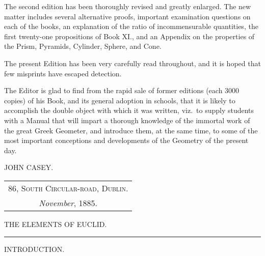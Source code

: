 \documentclass[oneside]{book}
\newcommand{\ibksp}{\hspace{-1.5em}}
\begin{document}
The second edition has been thoroughly revised
and greatly enlarged. The new matter includes
several alternative proofs, important examination
questions on each of the books, an explanation of
the ratio of incommensurable quantities, the first
twenty-one propositions of Book XI\@., and an
Appendix on the properties of the Prism, Pyramids,
Cylinder, Sphere, and Cone.

The present Edition has been very carefully
read throughout, and it is hoped that few misprints
have escaped detection.

The Editor is glad to find from the rapid sale of
former editions (each 3000 copies) of his Book, and
its general adoption in schools, that it is likely to
accomplish the double object with which it was
written, viz.\ to supply students with a Manual
that will impart a thorough knowledge of the
immortal work of the great Greek Geometer, and
introduce them, at the same time, to some of the
most important conceptions and developments of
the Geometry of the present day.
\bigskip

\begin{flushright}
JOHN CASEY. \mbox\quad
\end{flushright}
\bigskip

\noindent
\begin{tabular}{@{}c@{}}
\textsc{86, South Circular-road, Dublin.}\\
\textit{November}, 1885.
\end{tabular}

\tableofcontents


\newpage
\mainmatter
\pagestyle{plain}
\addcontentsline{toc}{section}{\ibksp\textsc{Introduction,}}
\begin{center}
{\LARGE THE ELEMENTS OF EUCLID.}

\bigskip\rule[1ex]{3cm}{.2pt}\bigskip

{\Large INTRODUCTION.}
\end{center}
\end{document}

